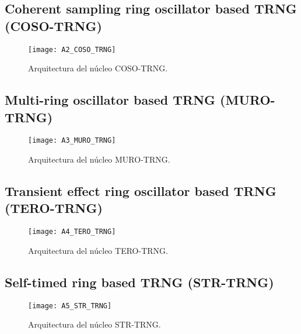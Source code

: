 			
			
		\subsection{Coherent sampling ring oscillator based TRNG (COSO-TRNG)}
	
				
				\begin{figure}[hbtp]
					\caption{Arquitectura del núcleo COSO-TRNG.}
					\centering
					\texttt{[image: A2\_COSO\_TRNG]}
					\label{fig:A2_COSO_TRNG}
				\end{figure}
				
				
				
		\subsection{Multi-ring oscillator based TRNG (MURO-TRNG)}
	
				
				\begin{figure}[hbtp]
					\caption{Arquitectura del núcleo MURO-TRNG.}
					\centering
					\texttt{[image: A3\_MURO\_TRNG]}
					\label{fig:A3_MURO_TRNG}
				\end{figure}
				
				
				
		\subsection{Transient effect ring oscillator based TRNG (TERO-TRNG)}
	
				
				\begin{figure}[hbtp]
					\caption{Arquitectura del núcleo TERO-TRNG.}
					\centering
					\texttt{[image: A4\_TERO\_TRNG]}
					\label{fig:A4_TERO_TRNG}
				\end{figure}
				
				
				
		\subsection{Self-timed ring based TRNG (STR-TRNG)}
	
				
				\begin{figure}[hbtp]
					\caption{Arquitectura del núcleo STR-TRNG.}
					\centering
					\texttt{[image: A5\_STR\_TRNG]}
					\label{fig:A5_STR_TRNG}
				\end{figure}
				
				
				

